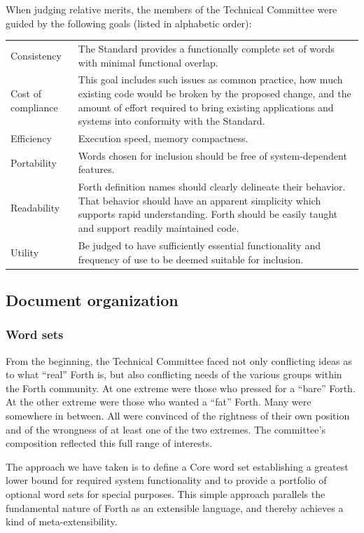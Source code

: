 When judging relative merits, the members of the  Technical
Committee were guided by the following goals (listed in alphabetic
order):

\begin{tabular}{lp{}}
Consistency	&
	The Standard provides a functionally complete set of words with
	minimal functional overlap.
	\\[\parskip]
Cost of compliance &
	This goal includes such issues as common practice, how much
	existing code would be broken by the proposed change, and the
	amount of effort required to bring existing applications and
	systems into conformity with the Standard.
	\\[\parskip]
Efficiency &
	Execution speed, memory compactness.
	\\[\parskip]
Portability	&
	Words chosen for inclusion should be free of system-dependent
	features.
	\\[\parskip]
Readability &
	Forth definition names should clearly delineate their behavior.
	That behavior should have an apparent simplicity which supports
	rapid understanding. Forth should be easily taught and support
	readily maintained code.
	\\[\parskip]
Utility	&
	Be judged to have sufficiently essential functionality and
	frequency of use to be deemed suitable for inclusion.
\end{tabular}


\subsection{Document organization} %

\subsubsection{Word sets} %

From the beginning, the  Technical Committee faced not only
conflicting ideas as to what ``real'' Forth is, but also conflicting
needs of the various groups within the Forth community. At one
extreme were those who pressed for a ``bare'' Forth. At the other
extreme were those who wanted a ``fat'' Forth. Many were somewhere
in between. All were convinced of the rightness of their own position
and of the wrongness of at least one of the two extremes. The
committee's composition reflected this full range of interests.

The approach we have taken is to define a Core word set establishing
a greatest lower bound for required system functionality and to
provide a portfolio of optional word sets for special purposes. This
simple approach parallels the fundamental nature of Forth as an
extensible language, and thereby achieves a kind of
meta-extensibility.

